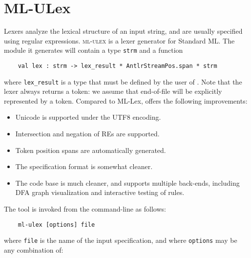 %
\chapter{ML-ULex}


Lexers analyze the lexical structure of an input string, and are usually specified using regular expressions.  \textsc{ml-ulex} is a lexer generator for Standard ML.  The module it generates will contain a type {\tt strm} and a function
\begin{verbatim}
    val lex : strm -> lex_result * AntlrStreamPos.span * strm
\end{verbatim}
where {\tt lex\_result} is a type that must be defined by the user of \ulex{}.  Note that the lexer always returns a token: we assume that end-of-file will be explicitly represented by a token.  Compared to ML-Lex, \ulex{} offers the following improvements:
\begin{itemize}
 \item Unicode is supported under the UTF8 encoding.
 \item Intersection and negation of REs are supported.
 \item Token position spans are automatically generated.
 \item The specification format is somewhat cleaner.
 \item The code base is much cleaner, and supports multiple back-ends, including DFA graph visualization and interactive testing of rules.
\end{itemize}
The tool is invoked from the command-line as follows:
\begin{verbatim}
    ml-ulex [options] file
\end{verbatim}
where {\tt file} is the name of the input \ulex{} specification, and where {\tt options} may be any combination of:

